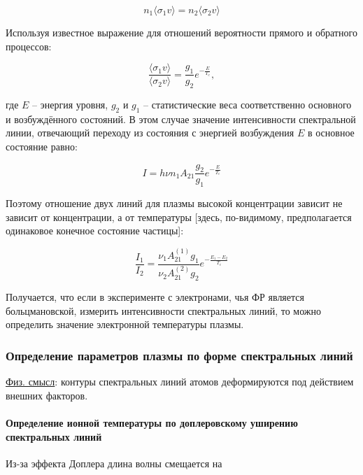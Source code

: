 \documentclass[10pt, a4paper]{article}
\begin{document}
\begin{equation*}
	n_1 \langle\sigma_1 v\rangle = n_2 \langle\sigma_2 v\rangle
\end{equation*}

Используя известное выражение для отношений вероятности прямого и обратного процессов:

\begin{equation*}
	\frac{\langle\sigma_1 v\rangle}{\langle\sigma_2 v\rangle} = \frac{g_1}{g_2} e^{-\frac{E}{T_e}},
\end{equation*}

где $E$ -- энергия уровня, $g_2$ и $g_1$ -- статистические веса соответственно основного и возбуждённого состояний.
В этом случае значение интенсивности спектральной линии, отвечающий переходу из состояния с энергией возбуждения $E$ в основное состояние равно:

\begin{equation*}
	I = h \nu n_1 A_{21}\frac{g_2}{g_1} e^{-\frac{E}{T_e}}
\end{equation*}

Поэтому отношение двух линий для плазмы высокой концентрации зависит не зависит от концентрации, а от температуры [здесь, по-видимому, предполагается одинаковое конечное состояние частицы]:

\begin{equation*}
	\frac{I_1}{I_2}=\frac{ \nu_1 A_{21}^{(1)} g_1}{ \nu_2 A_{21}^{(2)} g_2} e^{-\frac{E_1 - E_2}{T_e}}
\end{equation*}

Получается, что если в эксперименте с электронами, чья ФР является больцмановской, измерить интенсивности спектральных линий, то можно определить значение электронной температуры плазмы. 

\subsubsection{Определение параметров плазмы по форме спектральных линий}

\uline{Физ. смысл}: контуры спектральных линий атомов деформируются под действием внешних факторов.

\paragraph{Определение ионной температуры по доплеровскому уширению спектральных линий}

Из-за эффекта Доплера длина волны смещается на
 
\end{document}
